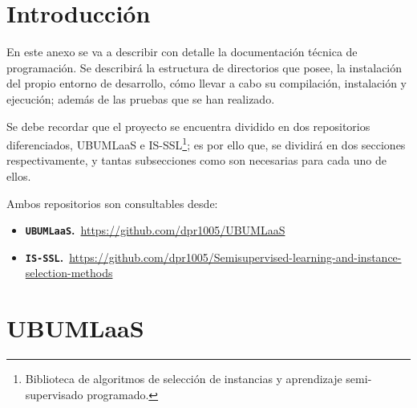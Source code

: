 
\section{Introducción}
En este anexo se va a describir con detalle la documentación técnica de programación. Se describirá la estructura de directorios que posee, la instalación del propio entorno de desarrollo, cómo llevar a cabo su compilación, instalación y ejecución; además de las pruebas que se han realizado.

Se debe recordar que el proyecto se encuentra dividido en dos repositorios diferenciados, UBUMLaaS e IS-SSL\footnote{Biblioteca de algoritmos de selección de instancias y aprendizaje semi-supervisado programado.}; es por ello que, se dividirá en dos secciones respectivamente, y tantas subsecciones como son necesarias para cada uno de ellos.

Ambos repositorios son consultables desde:
\begin{itemize}
\tightlist
\item \textbf{\texttt{UBUMLaaS}.}~\url{https://github.com/dpr1005/UBUMLaaS}
\item \textbf{\texttt{IS-SSL}.}~\url{https://github.com/dpr1005/Semisupervised-learning-and-instance-selection-methods} 
\end{itemize}

\section{UBUMLaaS}

